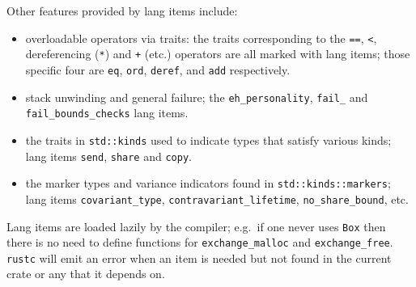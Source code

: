 \documentclass[]{article}
\begin{document}
Other features provided by lang items include:

\begin{itemize}
\itemsep1pt\parskip0pt
\item
  overloadable operators via traits: the traits corresponding to the
  \texttt{==}, \texttt{\textless{}}, dereferencing (\texttt{*}) and
  \texttt{+} (etc.) operators are all marked with lang items; those
  specific four are \texttt{eq}, \texttt{ord}, \texttt{deref}, and
  \texttt{add} respectively.
\item
  stack unwinding and general failure; the \texttt{eh\_personality},
  \texttt{fail\_} and \texttt{fail\_bounds\_checks} lang items.
\item
  the traits in \texttt{std::kinds} used to indicate types that satisfy
  various kinds; lang items \texttt{send}, \texttt{share} and
  \texttt{copy}.
\item
  the marker types and variance indicators found in
  \texttt{std::kinds::markers}; lang items \texttt{covariant\_type},
  \texttt{contravariant\_lifetime}, \texttt{no\_share\_bound}, etc.
\end{itemize}

Lang items are loaded lazily by the compiler; e.g.~if one never uses
\texttt{Box} then there is no need to define functions for
\texttt{exchange\_malloc} and \texttt{exchange\_free}. \texttt{rustc}
will emit an error when an item is needed but not found in the current
crate or any that it depends on.
\end{document}
